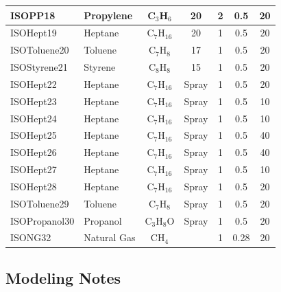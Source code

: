 \begin{table}[!ht]
\begin{center}
\begin{tabular}{|l|l|c|c|c|c|c|}
ISOPP18       &  Propylene    &  C$_3$H$_6$       &  20        &  2        &  0.5          &  20               \\ \hline
ISOHept19     &  Heptane      &  C$_7$H$_{16}$    &  20        &  1        &  0.5          &  20               \\ \hline
ISOToluene20  &  Toluene      &  C$_7$H$_8$       &  17        &  1        &  0.5          &  20               \\ \hline
ISOStyrene21  &  Styrene      &  C$_8$H$_8$       &  15        &  1        &  0.5          &  20               \\ \hline
ISOHept22     &  Heptane      &  C$_7$H$_{16}$    &  Spray     &  1        &  0.5          &  20               \\ \hline
ISOHept23     &  Heptane      &  C$_7$H$_{16}$    &  Spray     &  1        &  0.5          &  10               \\ \hline
ISOHept24     &  Heptane      &  C$_7$H$_{16}$    &  Spray     &  1        &  0.5          &  10               \\ \hline
ISOHept25     &  Heptane      &  C$_7$H$_{16}$    &  Spray     &  1        &  0.5          &  40               \\ \hline
ISOHept26     &  Heptane      &  C$_7$H$_{16}$    &  Spray     &  1        &  0.5          &  40               \\ \hline
ISOHept27     &  Heptane      &  C$_7$H$_{16}$    &  Spray     &  1        &  0.5          &  10               \\ \hline
ISOHept28     &  Heptane      &  C$_7$H$_{16}$    &  Spray     &  1        &  0.5          &  20               \\ \hline
ISOToluene29  &  Toluene      &  C$_7$H$_8$       &  Spray     &  1        &  0.5          &  20               \\ \hline
ISOPropanol30 &  Propanol     &  C$_3$H$_8$O      &  Spray     &  1        &  0.5          &  20               \\ \hline
ISONG32       &  Natural Gas  &  CH$_4$           &            &  1        &  0.28         &  20               \\ \hline
\end{tabular}
\end{center}
\label{tab:NIST_FSE_Exp}
\end{table}

\subsection{Modeling Notes}

